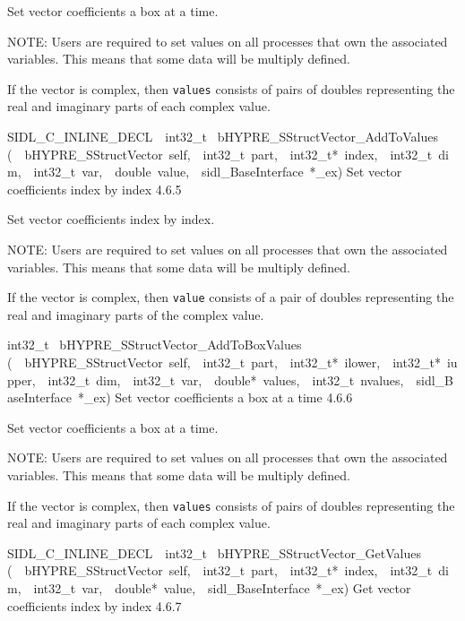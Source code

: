 \documentclass{article}
\begin{document}
\begin{cxxentry}
\begin{cxxentry}
\begin{cxxfunction}
\begin{cxxdoc}
Set vector coefficients a box at a time.

NOTE: Users are required to set values on all processes that
own the associated variables.  This means that some data will
be multiply defined.

If the vector is complex, then {\tt values} consists of pairs
of doubles representing the real and imaginary parts of each
complex value.
\end{cxxdoc}
\end{cxxfunction}
\begin{cxxfunction}
{SIDL\_C\_INLINE\_DECL\ \ int32\_t\ }
        {bHYPRE\_SStructVector\_AddToValues}
        {(\ \ bHYPRE\_SStructVector\ self,\ \ int32\_t\ part,\ \ int32\_t*\ index,\ \ int32\_t\ dim,\ \ int32\_t\ var,\ \ double\ value,\ \ sidl\_BaseInterface\ *\_ex)}
        {
Set vector coefficients index by index}
        {4.6.5}
\begin{cxxdoc}

Set vector coefficients index by index.

NOTE: Users are required to set values on all processes that
own the associated variables.  This means that some data will
be multiply defined.

If the vector is complex, then {\tt value} consists of a pair
of doubles representing the real and imaginary parts of the
complex value.
\end{cxxdoc}
\end{cxxfunction}
\begin{cxxfunction}
{int32\_t\ }
        {bHYPRE\_SStructVector\_AddToBoxValues}
        {(\ \ bHYPRE\_SStructVector\ self,\ \ int32\_t\ part,\ \ int32\_t*\ ilower,\ \ int32\_t*\ iupper,\ \ int32\_t\ dim,\ \ int32\_t\ var,\ \ double*\ values,\ \ int32\_t\ nvalues,\ \ sidl\_BaseInterface\ *\_ex)}
        {
Set vector coefficients a box at a time}
        {4.6.6}
\begin{cxxdoc}

Set vector coefficients a box at a time.

NOTE: Users are required to set values on all processes that
own the associated variables.  This means that some data will
be multiply defined.

If the vector is complex, then {\tt values} consists of pairs
of doubles representing the real and imaginary parts of each
complex value.
\end{cxxdoc}
\end{cxxfunction}
\begin{cxxfunction}
{SIDL\_C\_INLINE\_DECL\ \ int32\_t\ }
        {bHYPRE\_SStructVector\_GetValues}
        {(\ \ bHYPRE\_SStructVector\ self,\ \ int32\_t\ part,\ \ int32\_t*\ index,\ \ int32\_t\ dim,\ \ int32\_t\ var,\ \ double*\ value,\ \ sidl\_BaseInterface\ *\_ex)}
        {
Get vector coefficients index by index}
        {4.6.7}
\begin{cxxdoc}


\end{cxxdoc}
\end{cxxfunction}
\end{cxxentry}
\end{cxxentry}
\end{document}
